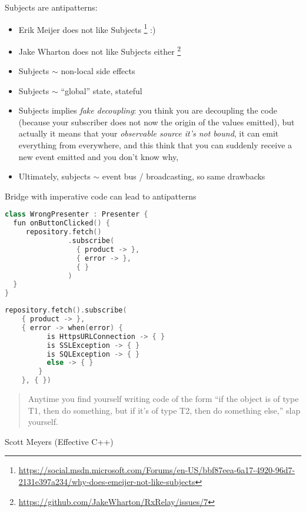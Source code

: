 \documentclass[10pt]{beamer}
\begin{document}
\begin{frame}
	Subjects are antipatterns:
	\begin{itemize}
		\item Erik Meijer does not like Subjects%
\footnote{\url{https://social.msdn.microsoft.com/Forums/en-US/bbf87eea-6a17-4920-96d7-2131e397a234/why-does-emeijer-not-like-subjects}} :)
		\item  Jake Wharton does not like Subjects either%
\footnote{\url{https://github.com/JakeWharton/RxRelay/issues/7}}
		\item  Subjects $\sim$ non-local side effects%
		\item  Subjects $\sim$ ``global'' state, stateful 
		\item  Subjects implies \emph{fake decoupling}: you think you are decoupling the code (because your subscriber does not now the origin of the values emitted), but actually it means that your \emph{observable source it's not bound}, it can emit everything from everywhere, and this think that you can suddenly receive a new event emitted and you don’t know why, 
		\item Ultimately, subjects $\sim$ event bus / broadcasting, so same drawbacks
	\end{itemize}
\end{frame}

\begin{frame}[fragile]
	Bridge with imperative code can lead to antipatterns
\begin{lstlisting}[language=C++,basicstyle=\ttfamily,keywordstyle=\color{red}]
class WrongPresenter : Presenter {
  fun onButtonClicked() {
     repository.fetch()
               .subscribe(
                 { product -> },
                 { error -> },
                 { }
               )
  }
}
\end{lstlisting}
\end{frame}
\begin{frame}[fragile]
\begin{lstlisting}[language=C++,basicstyle=\ttfamily,keywordstyle=\color{red}]
repository.fetch().subscribe(
    { product -> },
    { error -> when(error) {
          is HttpsURLConnection -> { }
          is SSLException -> { }
          is SQLException -> { }
          else -> { }
        }
    }, { })
\end{lstlisting}
	\begin{quotation}
Anytime you find yourself writing code of the form “if the object is of type T1, then do something, but if it’s of type T2, then do something else,” slap yourself.
	\end{quotation}
	Scott Meyers (Effective C++)
\end{frame}
\end{document}

